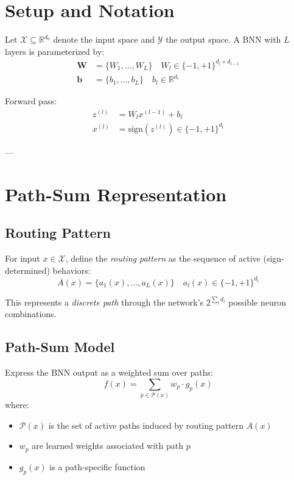 \section{Setup and Notation}

Let $\mathcal{X} \subseteq \mathbb{R}^{d_0}$ denote the input space and $\mathcal{Y}$ the output space.
A BNN with $L$ layers is parameterized by:
\begin{align}
\mathbf{W} &= \{W_1, \ldots, W_L\} \quad W_l \in \{-1, +1\}^{d_l \times d_{l-1}} \\
\mathbf{b} &= \{b_1, \ldots, b_L\} \quad b_l \in \mathbb{R}^{d_l}
\end{align}

Forward pass:
\begin{align}
z^{(l)} &= W_l x^{(l-1)} + b_l \\
x^{(l)} &= \text{sign}(z^{(l)}) \in \{-1, +1\}^{d_l}
\end{align}

---

\section{Path-Sum Representation}

\subsection{Routing Pattern}
For input $x \in \mathcal{X}$, define the \emph{routing pattern} as the sequence of active (sign-determined) behaviors:
$$A(x) = \{a_1(x), \ldots, a_L(x)\} \quad a_l(x) \in \{-1, +1\}^{d_l}$$

This represents a \emph{discrete path} through the network's $2^{\sum_l d_l}$ possible neuron combinations.

\subsection{Path-Sum Model}
Express the BNN output as a weighted sum over paths:
$$f(x) = \sum_{p \in \mathcal{P}(x)} w_p \cdot g_p(x)$$
where:
\begin{itemize}
  \item $\mathcal{P}(x)$ is the set of active paths induced by routing pattern $A(x)$
  \item $w_p$ are learned weights associated with path $p$
  \item $g_p(x)$ is a path-specific function
\end{itemize}

